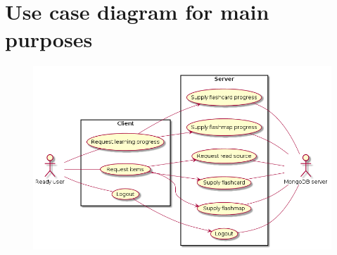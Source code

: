 \section{Use case diagram for main purposes}
\label{app:mainusecase}
\begin{figure}[h!]
\centering
\includegraphics[width=\textwidth]{img/mainusecase.png}
\end{figure}
